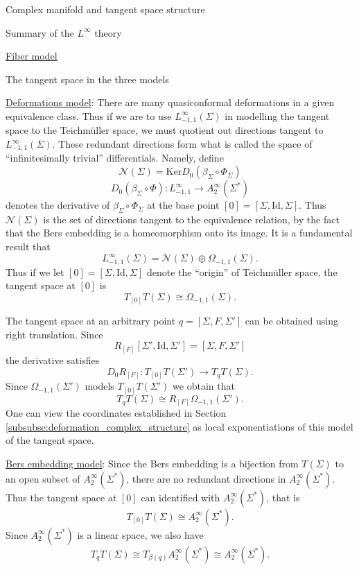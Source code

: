 \documentclass[12pt]{amsart}
\newcommand{\riem}{\Sigma}  %
\theoremstyle{plain}
\theoremstyle{definition}
\theoremstyle{remark}
\numberwithin{equation}{section} %
\numberwithin{figure}{section} %
\begin{document}
\begin{section}{Complex manifold and tangent space structure}
\begin{subsection}{Summary of the $L^\infty$ theory}
\begin{subsubsection}{\underline{Fiber model}}
 \end{subsubsection} 
\end{subsection}

\begin{subsection}{The tangent space in the three models}\label{subse:tangent_space}

{\underline{Deformations model}}: There are many quasiconformal deformations in a given equivalence class. Thus if we are to use  $L^\infty_{-1,1}(\riem)$ in modelling the tangent space to the Teichm\"uller space, we must quotient out directions tangent to  $L^\infty_{-1,1}(\riem)$.  These redundant directions form what is called the space of ``infinitesimally trivial'' differentials. Namely, define
 \[  \mathcal{N}(\riem) =  \mathrm{Ker} D_0 (\beta_\riem \circ \Phi_\riem) \]
  \begin{equation}\label{derivative} D_0 (\beta_\riem \circ \Phi) : L^\infty_{-1,1} \rightarrow A_2^\infty(\riem^*)   \end{equation}
   denotes the derivative of  $\beta_\riem \circ \Phi_\riem$ at the base point $[0]=[\riem,\mathrm{Id},\riem]$. 
   Thus $\mathcal{N}(\riem)$ is the set of directions tangent to the equivalence relation, by the fact that the Bers embedding is a homeomorphism onto its image.  
   It is a fundamental result that
   \begin{equation} \label{eq:harmonic_Bel_decomposition}
     L^\infty_{-1,1}(\riem) = \mathcal{N}(\riem) \oplus \Omega_{-1,1}(\riem).   
   \end{equation}
   Thus if we let $[0]=[\riem, \mathrm{Id},\riem]$ denote the ``origin'' of Teichm\"uller space, the tangent space at $[0]$ is 
   \[ T_{[0]} T(\riem) \cong \Omega_{-1,1}(\riem).  \]

   The tangent space at an arbitrary point $q=[\riem,F,\riem']$ can be obtained using right translation. Since 
   \[ R_{[F]}[\riem',\mathrm{Id},\riem']=[\riem,F,\riem'] \]
   the derivative satisfies
   \[ D_0 R_{[F]}: T_{[0]} T(\riem') \rightarrow T_q T(\riem).  \]
   Since $\Omega_{-1,1}(\riem')$ models $T_{[0]} T(\riem')$ we obtain
   that 
   \begin{equation}  \label{eq:arbitrary_tangent_space_model}
     T_q T(\riem) \cong R_{[F]} \Omega_{-1,1}(\riem').   
   \end{equation}
   One can view the coordinates established in Section \ref{subsubse:deformation_complex_structure} as local exponentiations of this model of the tangent space. 

   {\underline{Bers embedding model}}:  Since the Bers embedding is a bijection from $T(\riem)$ to an open subset of $A_2^\infty(\riem^*)$, there are no redundant directions in $A_2^\infty(\riem^*)$. Thus the tangent space at $[0]$ can identified with $A_2^\infty(\riem^*)$, that is
   \[ T_{[0]} T(\riem) \cong A_2^\infty(\riem^*).   \]
   Since $A_2^\infty(\riem^*)$ is a linear space, we also have 
   \[   T_q T(\riem) \cong T_{\beta(q)} A_2^\infty(\riem^*) \cong A_2^\infty(\riem^*). \]



\end{subsection}
\end{section}
\end{document}
